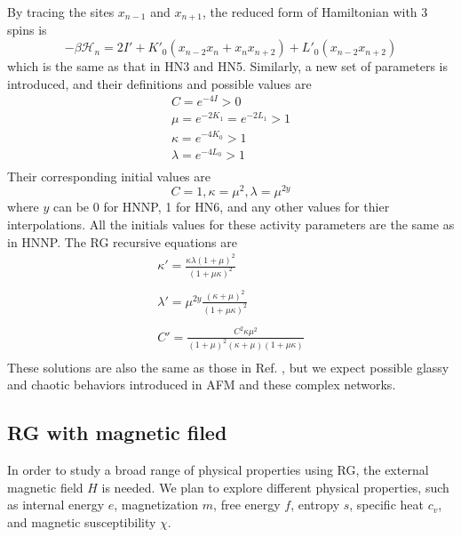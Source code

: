 By tracing the sites $x_{n-1}$ and $x_{n+1}$, the reduced form of Hamiltonian with 3 spins is
\begin{equation}
\label{eq:hnnpz1}
 -\beta \mathcal{H}_n = 2I' +  K'_0 \left(x_{n-2}x_{n} +  x_{n}x_{n+2}\right) + L'_0(x_{n-2}x_{n+2})
 \end{equation}
 which is the same as that in HN3 and HN5. Similarly, a new set of parameters is introduced, and their definitions and possible values are  
 \begin{equation}
\begin{array}{l}
\displaystyle C = e^{-4I} > 0   \\
\displaystyle \mu = e^{-2K_1} = e^{-2L_1} > 1 \\
\displaystyle \kappa = e^{-4K_0} > 1 \\
\displaystyle \lambda = e^{-4L_0}  > 1\\
\end{array} 
\label{eq:hn35-activities}
\end{equation}
Their corresponding initial values are 
 \begin{equation}
 C = 1,  \kappa = \mu^2,  \lambda =  \mu^{2y} 
\label{eq:hp-init2}
\end{equation}
where $y$ can be 0 for HNNP, 1 for HN6, and any other values for thier interpolations. All the initials values for these activity parameters are the same as in HNNP. The RG recursive equations are
\begin{equation}
\begin{array}{l}
\displaystyle \kappa' = \frac{\kappa \lambda (1+\mu)^2 }{(1+\mu\kappa)^2} \\
\\
\displaystyle \lambda' =\mu^{2y} \frac{(\kappa + \mu)^2} {(1 + \mu \kappa)^2} \\ \\
\displaystyle C' =  \frac{C^2 \kappa\mu^2} {(1+\mu)^2 (\kappa+\mu) (1+ \mu\kappa)}   \\
\end{array} 
\label{eq:afm-hpsol1}
\end{equation}
These solutions are also the same as those in Ref. \cite{Boettcher2011HNNP}, but we expect possible glassy and chaotic behaviors introduced in AFM and these complex networks.


\subsection{RG with magnetic filed}
In order to study a broad range of physical properties using RG, the external magnetic field $H$ is needed. We plan to explore different physical properties, such as internal energy $e$, magnetization $m$, free energy $f$, entropy $s$, specific heat $c_v$, and magnetic susceptibility $\chi$. 


